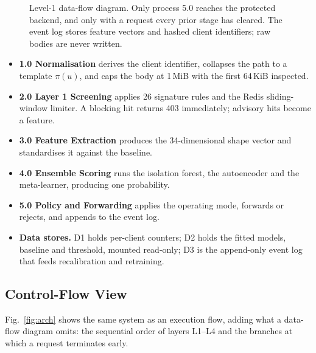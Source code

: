 \documentclass[conference]{IEEEtran}
\begin{document}
\begin{figure}[t]
\caption{Level-1 data-flow diagram. Only process 5.0 reaches the protected backend, and only
with a request every prior stage has cleared. The event log stores feature vectors and hashed
client identifiers; raw bodies are never written.}
\label{fig:dfd}
\end{figure}

\begin{itemize}[leftmargin=1.2em,itemsep=1pt,topsep=2pt]
  \item \textbf{1.0 Normalisation} derives the client identifier, collapses the path to a
        template $\pi(u)$, and caps the body at 1\,MiB with the first 64\,KiB inspected.
  \item \textbf{2.0 Layer 1 Screening} applies 26 signature rules and the Redis sliding-window
        limiter. A blocking hit returns 403 immediately; advisory hits become a feature.
  \item \textbf{3.0 Feature Extraction} produces the 34-dimensional shape vector and
        standardises it against the baseline.
  \item \textbf{4.0 Ensemble Scoring} runs the isolation forest, the autoencoder and the
        meta-learner, producing one probability.
  \item \textbf{5.0 Policy and Forwarding} applies the operating mode, forwards or rejects,
        and appends to the event log.
  \item \textbf{Data stores.} D1 holds per-client counters; D2 holds the fitted models,
        baseline and threshold, mounted read-only; D3 is the append-only event log that feeds
        recalibration and retraining.
\end{itemize}

\subsection{Control-Flow View}
\label{sec:flow}
Fig.~\ref{fig:arch} shows the same system as an execution flow, adding what a data-flow
diagram omits: the sequential order of layers L1--L4 and the branches at which a request
terminates early.
\end{document}
